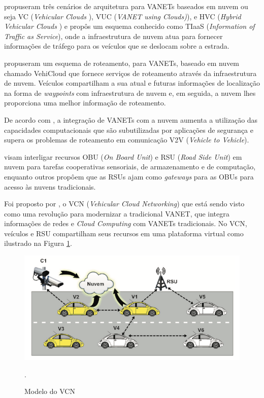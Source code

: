 \documentclass[
	12pt,				%
	oneside,			%
	a4paper,			%
	english,			%
	brazil				%
	]{abntex2ppgsi}
\begin{document}
  propuseram três cenários de arquitetura para VANETs baseados em nuvem ou seja VC (\textit{Vehicular Clouds }), VUC (\textit{VANET using Clouds)}), e HVC (\textit{Hybrid Vehicular Clouds }) e propôs um esquema conhecido como TIaaS (\textit{Information of Traffic as Service}), onde a infraestrutura de nuvem atua para fornecer informações de tráfego para os veículos que se deslocam sobre a estrada.

  propuseram um esquema de roteamento, para VANETs, baseado em nuvem chamado VehiCloud que fornece serviços de roteamento através da infraestrutura de nuvem. Veículos compartilham a sua atual e futuras informações de localização na forma de \textit{waypoints} com infraestrutura de nuvem e, em seguida, a nuvem lhes proporciona uma melhor informação de roteamento.

De acordo com , a integração de VANETs com a nuvem aumenta a utilização das capacidades computacionais que são subutilizadas por aplicações de segurança e supera os problemas de roteamento em comunicação V2V (\textit{Vehicle to Vehicle}).

 visam interligar recursos OBU (\textit{On Board Unit}) e RSU (\textit{Road Side Unit}) em nuvem para tarefas cooperativas sensoriais, de armazenamento e de computação, enquanto outros \cite{hussain2012rethinking} \cite{mershad2013finding} propôem que as RSUs ajam como \textit{gateways} para as OBUs para acesso às nuvens tradicionais.

Foi proposto por , o VCN (\textit{Vehicular Cloud Networking}) que está sendo visto como uma revolução para modernizar a tradicional VANET, que integra informações de redes e \textit{Cloud Computing} com VANETs tradicionais. No VCN, veículos e  RSU compartilham seus recursos em uma plataforma virtual como ilustrado na Figura \ref{fig:vcn}.

\begin{figure}[h!]
	\centering
	\includegraphics[width=0.7\columnwidth]{images/vcn.png}
	\caption{Modelo do VCN \cite{lee2014vehicular}}.
	\label{fig:vcn}
\end{figure}
\end{document}
